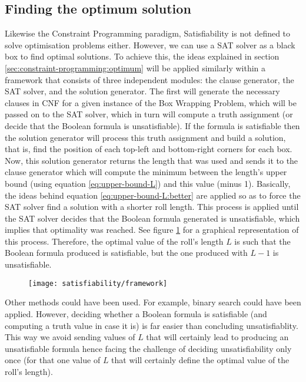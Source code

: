 \subsection{Finding the optimum solution}
\label{sec:satisfiability:optimum}

Likewise the Constraint Programming paradigm, Satisfiability is not defined to solve
optimisation problems either. However, we can use a SAT solver as a black box to find
optimal solutions. To achieve this, the ideas explained in section
\ref{sec:constraint-programming:optimum} will be applied similarly within a framework
that consists of three independent modules: the clause generator,
the SAT solver, and the solution generator. The first will generate the necessary
clauses in CNF for a given instance of the Box Wrapping Problem, which will be passed
on to the SAT solver, which in turn will compute a truth assignment (or decide that the
Boolean formula is unsatisfiable). If the formula is satisfiable then the solution
generator will process this truth assignment and build a solution, that is, find
the position of each top-left and bottom-right corners for each box. Now, this
solution generator returns the length that was used and sends it to the clause generator
which will compute the minimum between the length's upper bound (using equation
\ref{eq:upper-bound-L}) and this value (minus 1). Basically, the ideas behind equation
\ref{eq:upper-bound-L:better} are applied so as to force the SAT solver find a solution
with a shorter roll length. This process is applied until the SAT solver decides that
the Boolean formula generated is unsatisfiable, which implies that optimality was reached.
See figure \ref{fig:satisfiability:framework} for a graphical representation of this
process. Therefore, the optimal value of the roll's length $L$ is such that the Boolean
formula produced is satisfiable, but the one produced with $L - 1$ is unsatisfiable.

\begin{figure}[H]
	\centering
	\texttt{[image: satisfiability/framework]}
	\label{fig:satisfiability:framework}
\end{figure}

Other methods could have been used. For example, binary search could have been applied.
However, deciding whether a Boolean formula is satisfiable (and computing a
truth value in case it is) is far easier than concluding unsatisfiablity. This way
we avoid sending values of $L$ that will certainly lead to producing an unsatisfiable
formula hence facing the challenge of deciding unsatisfiability only once (for that
one value of $L$ that will certainly define the optimal value of the roll's length).

